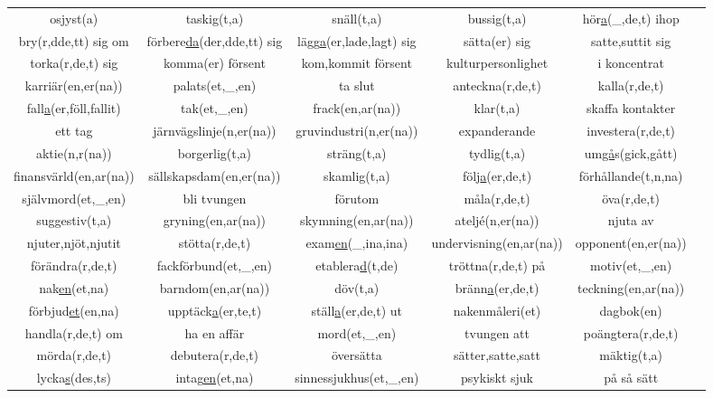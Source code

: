 \begin{center}
\begin{adjustwidth}{-2.8cm}{}
\begin{tabular}{|c c c c c c|}
            osjyst(a) & taskig(t,a) & snäll(t,a) & bussig(t,a) & hör\underline{a}(\_,de,t) ihop &  \\
            bry(r,dde,tt) sig om & förbere\underline{da}(der,dde,tt) sig & lägg\underline{a}(er,lade,lagt) sig & sätta(er) sig & satte,suttit sig &  \\
            torka(r,de,t) sig & komma(er) försent & kom,kommit försent & kulturpersonlighet & i koncentrat &  \\
            karriär(en,er(na)) & palats(et,\_,en) & ta slut & anteckna(r,de,t) & kalla(r,de,t) &  \\
            fall\underline{a}(er,föll,fallit) & tak(et,\_,en) & frack(en,ar(na)) & klar(t,a) & skaffa kontakter &  \\
            ett tag & järnvägslinje(n,er(na)) & gruvindustri(n,er(na)) & expanderande & investera(r,de,t) &  \\
            aktie(n,r(na)) & borgerlig(t,a) & sträng(t,a) & tydlig(t,a) & um\underline{gå}s(gick,gått) &  \\
            finansvärld(en,ar(na)) & sällskapsdam(en,er(na)) & skamlig(t,a) & följ\underline{a}(er,de,t) & förhållande(t,n,na) &  \\
            självmord(et,\_,en) & bli tvungen & förutom & måla(r,de,t) & öva(r,de,t) &  \\
            suggestiv(t,a) & gryning(en,ar(na)) & skymning(en,ar(na)) & atelj\'{e}(n,er(na)) & njuta av &  \\
            njuter,njöt,njutit  & stötta(r,de,t) & exam\underline{en}(\_,ina,ina) & undervisning(en,ar(na)) & opponent(en,er(na)) &  \\
            förändra(r,de,t) & fackförbund(et,\_,en) & etablera\underline{d}(t,de) & tröttna(r,de,t) på & motiv(et,\_,en) &  \\
            nak\underline{en}(et,na) & barndom(en,ar(na)) & döv(t,a) & bränn\underline{a}(er,de,t) & teckning(en,ar(na)) &  \\
            förbjud\underline{et}(en,na) & upptäck\underline{a}(er,te,t) & ställ\underline{a}(er,de,t) ut & nakenmåleri(et) & dagbok(en) &  \\
            handla(r,de,t) om & ha en affär & mord(et,\_,en) & tvungen att & poängtera(r,de,t) &  \\
            mörda(r,de,t) & debutera(r,de,t) & översätta & sätter,satte,satt & mäktig(t,a) &  \\
            lycka\underline{s}(des,ts) & intag\underline{en}(et,na) & sinnessjukhus(et,\_,en) & psykiskt sjuk & på så sätt &  \\

\end{tabular}
\end{adjustwidth}
\end{center}
